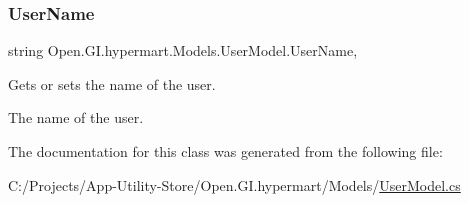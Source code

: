 \subsubsection{\texorpdfstring{User\+Name}{UserName}}
{\footnotesize\ttfamily string Open.\+G\+I.\+hypermart.\+Models.\+User\+Model.\+User\+Name\hspace{0.3cm}{\ttfamily [get]}, {\ttfamily [set]}}



Gets or sets the name of the user. 

The name of the user. 

The documentation for this class was generated from the following file\+:\begin{DoxyCompactItemize}
\item 
C\+:/\+Projects/\+App-\/\+Utility-\/\+Store/\+Open.\+G\+I.\+hypermart/\+Models/\hyperlink{_user_model_8cs}{User\+Model.\+cs}\end{DoxyCompactItemize}
